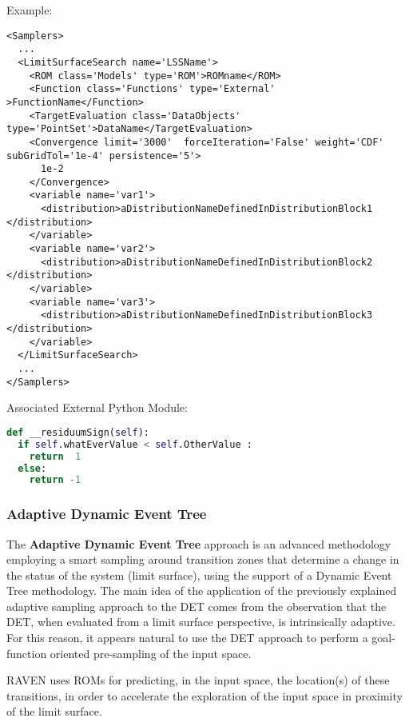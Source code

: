 Example:
\begin{lstlisting}[style=XML,morekeywords={class,limit,subGridTol,weight,persistence}]
<Samplers>
  ...
  <LimitSurfaceSearch name='LSSName'>
    <ROM class='Models' type='ROM'>ROMname</ROM>
    <Function class='Functions' type='External' >FunctionName</Function>
    <TargetEvaluation class='DataObjects' type='PointSet'>DataName</TargetEvaluation>
    <Convergence limit='3000'  forceIteration='False' weight='CDF'  subGridTol='1e-4' persistence='5'>
      1e-2
    </Convergence>
    <variable name='var1'>
      <distribution>aDistributionNameDefinedInDistributionBlock1 </distribution>
    </variable>
    <variable name='var2'>
      <distribution>aDistributionNameDefinedInDistributionBlock2 </distribution>
    </variable>
    <variable name='var3'>
      <distribution>aDistributionNameDefinedInDistributionBlock3 </distribution>
    </variable>
  </LimitSurfaceSearch>
  ...
</Samplers>
\end{lstlisting}

Associated External Python Module:
\begin{lstlisting}[language=python]
def __residuumSign(self):
  if self.whatEverValue < self.OtherValue :
    return  1
  else:
    return -1
\end{lstlisting}

\subsubsection{Adaptive Dynamic Event Tree}
\label{subsubsubsec:ADET}
The \textbf{Adaptive Dynamic Event Tree} approach is an advanced methodology
employing a smart sampling around transition zones that determine a change in
the status of the system (limit surface), using the support of a Dynamic Event
Tree methodology.
%
The main idea of the application of the previously explained adaptive sampling
approach to the DET comes from the observation that the DET, when evaluated from
a limit surface perspective, is intrinsically adaptive.
%
For this reason, it appears natural to use the DET approach to perform a
goal-function oriented pre-sampling of the input space.

RAVEN uses ROMs for predicting, in the input space,
the location(s) of these transitions, in order to accelerate the exploration of
the input space in proximity of the limit surface.

%
\attrIntro

